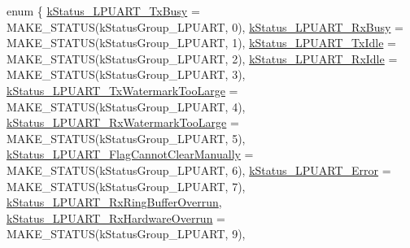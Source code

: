 \begin{DoxyCompactItemize}
\item 
enum \{ \newline
\mbox{\hyperlink{group__lpuart__driver_gga157d5577a5b2f5986037d0d09c7dc77dabddb317db7dfffa95856604bfac2a17f}{k\+Status\+\_\+\+L\+P\+U\+A\+R\+T\+\_\+\+Tx\+Busy}} = M\+A\+K\+E\+\_\+\+S\+T\+A\+T\+US(k\+Status\+Group\+\_\+\+L\+P\+U\+A\+RT, 0), 
\mbox{\hyperlink{group__lpuart__driver_gga157d5577a5b2f5986037d0d09c7dc77da98dfeab0a23c81f6b7f2c18acff8cc30}{k\+Status\+\_\+\+L\+P\+U\+A\+R\+T\+\_\+\+Rx\+Busy}} = M\+A\+K\+E\+\_\+\+S\+T\+A\+T\+US(k\+Status\+Group\+\_\+\+L\+P\+U\+A\+RT, 1), 
\mbox{\hyperlink{group__lpuart__driver_gga157d5577a5b2f5986037d0d09c7dc77da079c6d0957d121ce7cd95cf97487dfbb}{k\+Status\+\_\+\+L\+P\+U\+A\+R\+T\+\_\+\+Tx\+Idle}} = M\+A\+K\+E\+\_\+\+S\+T\+A\+T\+US(k\+Status\+Group\+\_\+\+L\+P\+U\+A\+RT, 2), 
\mbox{\hyperlink{group__lpuart__driver_gga157d5577a5b2f5986037d0d09c7dc77da02b8fe84bbfd8c52856b5d48865f7088}{k\+Status\+\_\+\+L\+P\+U\+A\+R\+T\+\_\+\+Rx\+Idle}} = M\+A\+K\+E\+\_\+\+S\+T\+A\+T\+US(k\+Status\+Group\+\_\+\+L\+P\+U\+A\+RT, 3), 
\newline
\mbox{\hyperlink{group__lpuart__driver_gga157d5577a5b2f5986037d0d09c7dc77dabbee969cb0f7b4c49b44b10c4eb583cc}{k\+Status\+\_\+\+L\+P\+U\+A\+R\+T\+\_\+\+Tx\+Watermark\+Too\+Large}} = M\+A\+K\+E\+\_\+\+S\+T\+A\+T\+US(k\+Status\+Group\+\_\+\+L\+P\+U\+A\+RT, 4), 
\mbox{\hyperlink{group__lpuart__driver_gga157d5577a5b2f5986037d0d09c7dc77daca81b4d6e2e792c6d841b95ec25daad9}{k\+Status\+\_\+\+L\+P\+U\+A\+R\+T\+\_\+\+Rx\+Watermark\+Too\+Large}} = M\+A\+K\+E\+\_\+\+S\+T\+A\+T\+US(k\+Status\+Group\+\_\+\+L\+P\+U\+A\+RT, 5), 
\mbox{\hyperlink{group__lpuart__driver_gga157d5577a5b2f5986037d0d09c7dc77da07d5a5092ded158fe53ea4df940f8bdb}{k\+Status\+\_\+\+L\+P\+U\+A\+R\+T\+\_\+\+Flag\+Cannot\+Clear\+Manually}} = M\+A\+K\+E\+\_\+\+S\+T\+A\+T\+US(k\+Status\+Group\+\_\+\+L\+P\+U\+A\+RT, 6), 
\mbox{\hyperlink{group__lpuart__driver_gga157d5577a5b2f5986037d0d09c7dc77daf069a1997c3d25588d834ccb33dd35f4}{k\+Status\+\_\+\+L\+P\+U\+A\+R\+T\+\_\+\+Error}} = M\+A\+K\+E\+\_\+\+S\+T\+A\+T\+US(k\+Status\+Group\+\_\+\+L\+P\+U\+A\+RT, 7), 
\newline
\mbox{\hyperlink{group__lpuart__driver_gga157d5577a5b2f5986037d0d09c7dc77da45a7ed684f4c31aec8999b3da68d3b5e}{k\+Status\+\_\+\+L\+P\+U\+A\+R\+T\+\_\+\+Rx\+Ring\+Buffer\+Overrun}}, 
\mbox{\hyperlink{group__lpuart__driver_gga157d5577a5b2f5986037d0d09c7dc77daf8ada3eacff87751ec865b4fc584bac1}{k\+Status\+\_\+\+L\+P\+U\+A\+R\+T\+\_\+\+Rx\+Hardware\+Overrun}} = M\+A\+K\+E\+\_\+\+S\+T\+A\+T\+US(k\+Status\+Group\+\_\+\+L\+P\+U\+A\+RT, 9), 

\end{DoxyCompactItemize}
